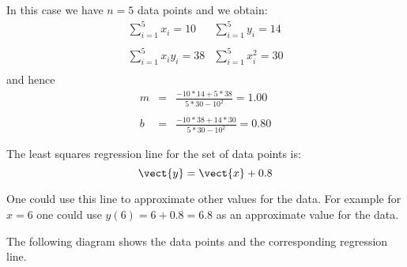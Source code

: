 \begin{solution}
In this case we have $n=5$ data points and we obtain:
\begin{equation*}
\begin{array}{ll}
\sum_{i=1}^{5}x_{i} = 10 & \sum_{i=1}^{5}y_{i} =  14 \\
\\
\sum_{i=1}^{5}x_{i}y_{i}  =  38 & \sum_{i=1}^{5}x_{i}^{2}  =   30\\
\end{array}
\end{equation*}
and hence
\begin{eqnarray*}
m &=& \frac{- 10 * 14 + 5*38}{5*30-10^2} = 1.00 \\
\\
b &=& \frac{- 10 * 38 + 14*30}{5*30-10^2} = 0.80
\end{eqnarray*}

The  least squares regression line for the set of data points is:
\[ \vect{y} = \vect{x}+0.8 \]

One could use this line to approximate other values for the data. For
example for $x=6$ one could use $y(6)=6+0.8=6.8$ as an approximate
value for the data.

The following diagram shows the data points and the corresponding regression line.

\begin{center}
\end{center}
\end{solution}

